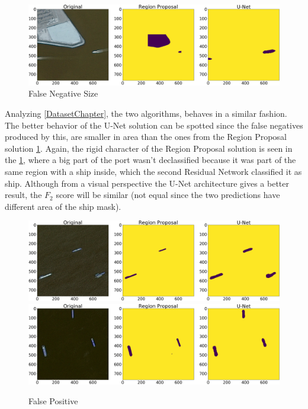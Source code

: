 \begin{figure}
	\includegraphics[width=\textwidth]{Pictures/016Comparison4.png}
	\caption{False Negative Size}
	\label{false_neg_size}
\end{figure}

Analyzing \ref{DatasetChapter}, the two algorithms, behaves in a similar fashion. The better behavior of the U-Net solution can be spotted since the false negatives produced by this, are smaller in area than the ones from the Region Proposal solution \ref{false_neg_size}. Again, the rigid character of the Region Proposal solution is seen in the \ref{false_neg_size}, where a big part of the port wasn't declassified because it was part of the same region with a ship inside, which the second Residual Network classified it as ship. Although from a visual perspective the U-Net architecture gives a better result, the $F_2$ score will be similar (not equal since the two predictions have different area of the ship mask).

\begin{figure}[H]
	\includegraphics[width=\textwidth]{Pictures/016Comparison1.png}\\
	\includegraphics[width=\textwidth]{Pictures/016Comparison2.png}
	\caption{False Positive}
	\label{false_positive}
\end{figure}

